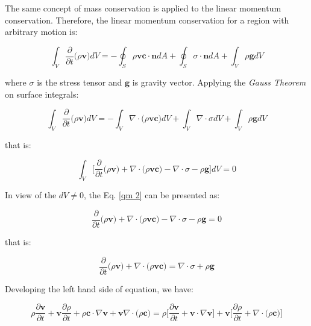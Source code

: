 The same concept of mass conservation is applied to the
linear momentum conservation. 
Therefore, the linear momentum conservation 
for a region with arbitrary motion is:


\begin{equation}
 \int_{V} \frac{\partial}{\partial t} \big( \rho \textbf{v} \big) dV
 = - 
 \oint_{S} \rho \textbf{v} \textbf{c} \cdot \textbf{n} dA
 +
 \oint_{S} \sigma \cdot \textbf{n} dA
 +
 \int_{V} \rho \textbf{g} dV
\end{equation}

\medskip
\noindent
where $\sigma$ is the stress tensor and 
$\textbf{g}$ is gravity vector.
Applying the \textit{Gauss Theorem} on surface integrals:

\begin{equation}
 \int_{V} \frac{\partial}{\partial t} \big( \rho \textbf{v} \big) dV
 = - 
 \int_{V} \nabla \cdot \big( \rho \textbf{v} \textbf{c} \big) dV
 +
 \int_{V} \nabla \cdot \sigma dV
 +
 \int_{V} \rho \textbf{g} dV
\end{equation}

\medskip
\noindent
that is:

\begin{equation} \label{qm 2}
 \int_{V} \Bigg[ \frac{\partial}{\partial t} \big( \rho \textbf{v} \big)
 + 
 \nabla \cdot \big( \rho \textbf{v} \textbf{c} \big)
 -
 \nabla \cdot \sigma
 -
 \rho \textbf{g} \Bigg] dV = 0
\end{equation}



\medskip
\noindent
In view of the $dV \neq 0$,
the Eq. \ref{qm 2} can be presented as:



\begin{equation}
 \frac{\partial}{\partial t} \big( \rho \textbf{v} \big)
 + 
 \nabla \cdot \big( \rho \textbf{v} \textbf{c} \big)
 -
 \nabla \cdot \sigma
 -
 \rho \textbf{g} = 0
\end{equation}


\medskip
\noindent
that is:

\begin{equation}
 \frac{\partial}{\partial t} \big( \rho \textbf{v} \big) 
 +
 \nabla \cdot \big( \rho \textbf{v} \textbf{c} \big)
 =
 \nabla \cdot \sigma
 +
 \rho \textbf{g}
\end{equation}

\medskip
\noindent
Developing the left hand side of equation, we have:

\begin{equation}
 \rho \frac{\partial \textbf{v}}{\partial t}
 +
 \textbf{v} \frac{\partial \rho}{\partial t}
 +
 \rho \textbf{c} \cdot \nabla \textbf{v}
 + 
 \textbf{v} \nabla \cdot \big( \rho \textbf{c} \big)
 =
 \rho \Bigg[ \frac{\partial \textbf{v}}{\partial t} + \textbf{v} \cdot \nabla \textbf{v} \Bigg]
 +
 \textbf{v} \Bigg[ \frac{\partial \rho}{\partial t} + \nabla \cdot \big( \rho \textbf{c} \big) \Bigg]
\end{equation}


